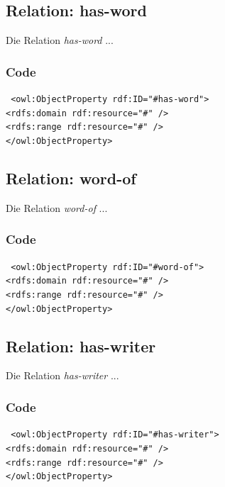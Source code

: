 ﻿\documentclass[
    11pt,
    latin1,
    a4paper,
    oneside
]{scrreprt}
\begin{document}
\subsection{Relation: has-word} \label{sec:rel_hasword}

Die Relation \emph{has-word} ...

\subsubsection{Code} \label{sec:rel_hasword_code}

\texttt{ <owl:ObjectProperty rdf:ID="#has-word"> \\
	<rdfs:domain rdf:resource="#" /> \\
	<rdfs:range rdf:resource="#" /> \\
</owl:ObjectProperty> }


\subsection{Relation: word-of} \label{sec:rel_wordof}

Die Relation \emph{word-of} ...

\subsubsection{Code} \label{sec:rel_wordof_code}

\texttt{ <owl:ObjectProperty rdf:ID="#word-of"> \\
	<rdfs:domain rdf:resource="#" /> \\
	<rdfs:range rdf:resource="#" /> \\
</owl:ObjectProperty> }


\subsection{Relation: has-writer} \label{sec:rel_haswriter}

Die Relation \emph{has-writer} ...

\subsubsection{Code} \label{sec:rel_haswriter_code}

\texttt{ <owl:ObjectProperty rdf:ID="#has-writer"> \\
	<rdfs:domain rdf:resource="#" /> \\
	<rdfs:range rdf:resource="#" /> \\
</owl:ObjectProperty> }
\end{document}
